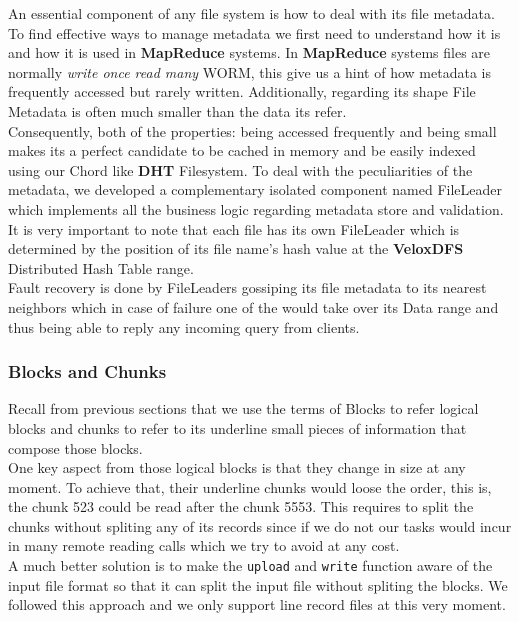An essential component of any file system is how to deal with its file
metadata. To find effective ways to manage metadata we first need to understand
how it is and how it is used in \textbf{MapReduce} systems. In
\textbf{MapReduce} systems files are normally \textit{write once read many}
WORM, this give us a hint of how metadata is frequently accessed but rarely
written. Additionally, regarding its shape File Metadata is often much smaller
than the data its refer.\\ 

Consequently, both of the properties: being accessed frequently and being small
makes its a perfect candidate to be cached in memory and be easily indexed
using our Chord like \textbf{DHT} Filesystem. To deal with the peculiarities of
the metadata, we developed a complementary isolated component named FileLeader
which implements all the business logic regarding metadata store and
validation. It is very important to note that each file has its own FileLeader
which is determined by the position of its file name's hash value at the
\textbf{VeloxDFS} Distributed Hash Table range. \\

Fault recovery is done by FileLeaders gossiping its file metadata to its
nearest neighbors which in case of failure one of the would take over its Data
range and thus being able to reply any incoming query from clients. 

\subsubsection{Blocks and Chunks}

Recall from previous sections that we use the terms of Blocks to refer logical
blocks and chunks to refer to its underline small pieces of information that
compose those blocks. \\ One key aspect from those logical blocks is that they
change in size at any moment. To achieve that, their underline chunks would
loose the order, this is, the chunk 523 could be read after the chunk 5553.
This requires to split the chunks without spliting any of its records since if
we do not our tasks would incur in many remote reading calls which we try to
avoid at any cost. \\

A much better solution is to make the \texttt{upload} and \texttt{write}
function aware of the input file format so that it can split the input file
without spliting the blocks. We followed this approach and we only support line
record files at this very moment.

